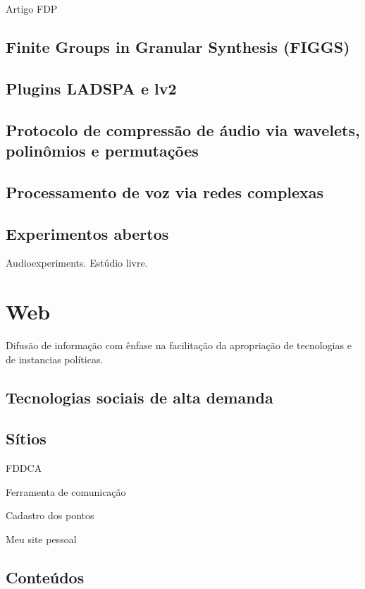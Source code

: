 Artigo FDP

\subsection{Finite Groups in Granular Synthesis (FIGGS)}

\subsection{Plugins LADSPA e lv2}

\subsection{Protocolo de compressão de áudio via wavelets, polinômios e permutações}

\subsection{Processamento de voz via redes complexas}

\subsection{Experimentos abertos}

Audioexperiments. Estúdio livre.


\section{Web}

Difusão de informação com ênfase na facilitação
da apropriação de tecnologias e de instancias políticas.

\subsection{Tecnologias sociais de alta demanda}

\subsection{Sítios}

FDDCA

Ferramenta de comunicação

Cadastro dos pontos

Meu site pessoal

\subsection{Conteúdos}


